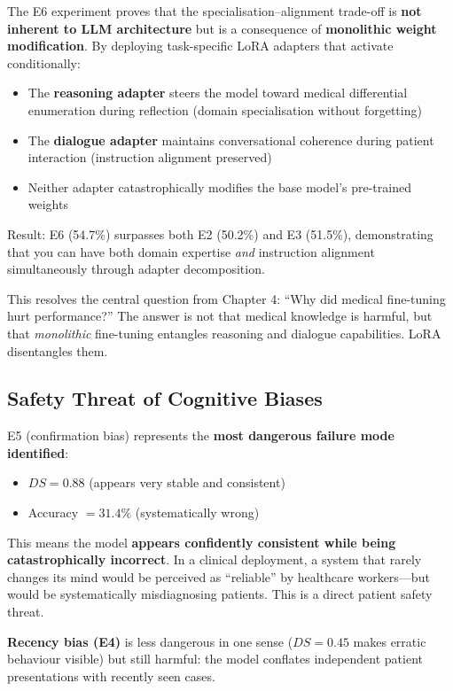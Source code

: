\begin{acadbox}[\textcolor{white}{Academic Definition}]
The E6 experiment proves that the specialisation--alignment trade-off is \textbf{not inherent to LLM architecture} but is a consequence of \textbf{monolithic weight modification}. By deploying task-specific LoRA adapters that activate conditionally:
\begin{itemize}
    \item The \textbf{reasoning adapter} steers the model toward medical differential enumeration during reflection (domain specialisation without forgetting)
    \item The \textbf{dialogue adapter} maintains conversational coherence during patient interaction (instruction alignment preserved)
    \item Neither adapter catastrophically modifies the base model's pre-trained weights
\end{itemize}

Result: E6 (54.7\%) surpasses both E2 (50.2\%) and E3 (51.5\%), demonstrating that you can have both domain expertise \textit{and} instruction alignment simultaneously through adapter decomposition.
\end{acadbox}

\begin{mattersbox}[\textcolor{white}{Why It Matters for This Thesis}]
This resolves the central question from Chapter 4: ``Why did medical fine-tuning hurt performance?'' The answer is not that medical knowledge is harmful, but that \textit{monolithic} fine-tuning entangles reasoning and dialogue capabilities. LoRA disentangles them.
\end{mattersbox}

\subsection{Safety Threat of Cognitive Biases}

\begin{acadbox}[\textcolor{white}{Academic Definition}]
E5 (confirmation bias) represents the \textbf{most dangerous failure mode identified}:
\begin{itemize}
    \item $DS = 0.88$ (appears very stable and consistent)
    \item Accuracy $= 31.4\%$ (systematically wrong)
\end{itemize}

This means the model \textbf{appears confidently consistent while being catastrophically incorrect}. In a clinical deployment, a system that rarely changes its mind would be perceived as ``reliable'' by healthcare workers---but would be systematically misdiagnosing patients. This is a direct patient safety threat.

\textbf{Recency bias (E4)} is less dangerous in one sense ($DS = 0.45$ makes erratic behaviour visible) but still harmful: the model conflates independent patient presentations with recently seen cases.
\end{acadbox}

